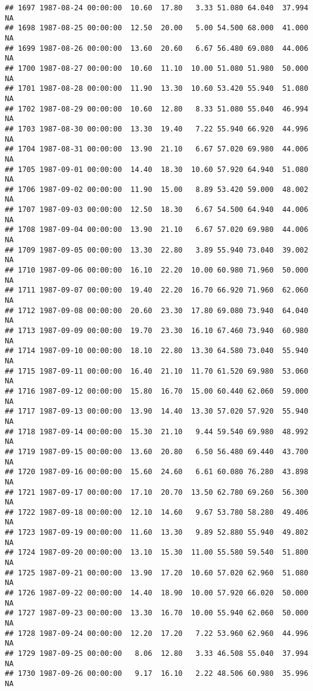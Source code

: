 \documentclass{article}\usepackage{graphicx, color}
\makeatletter
\newenvironment{kframe}{%
 \def\at@end@of@kframe{}%
 \ifinner\ifhmode%
  \def\at@end@of@kframe{\end{minipage}}%
  \begin{minipage}{\columnwidth}%
 \fi\fi%
 \def\FrameCommand##1{\hskip\@totalleftmargin \hskip-\fboxsep
 \colorbox{shadecolor}{##1}\hskip-\fboxsep
     \hskip-\linewidth \hskip-\@totalleftmargin \hskip\columnwidth}%
 \MakeFramed {\advance\hsize-\width
   \@totalleftmargin\z@ \linewidth\hsize
   \@setminipage}}%
 {\par\unskip\endMakeFramed%
 \at@end@of@kframe}
\newenvironment{knitrout}{}{} %
\makeatother
\begin{document}
\begin{knitrout}
\begin{kframe}
\begin{verbatim}
## 1697 1987-08-24 00:00:00  10.60  17.80   3.33 51.080 64.040  37.994     NA
## 1698 1987-08-25 00:00:00  12.50  20.00   5.00 54.500 68.000  41.000     NA
## 1699 1987-08-26 00:00:00  13.60  20.60   6.67 56.480 69.080  44.006     NA
## 1700 1987-08-27 00:00:00  10.60  11.10  10.00 51.080 51.980  50.000     NA
## 1701 1987-08-28 00:00:00  11.90  13.30  10.60 53.420 55.940  51.080     NA
## 1702 1987-08-29 00:00:00  10.60  12.80   8.33 51.080 55.040  46.994     NA
## 1703 1987-08-30 00:00:00  13.30  19.40   7.22 55.940 66.920  44.996     NA
## 1704 1987-08-31 00:00:00  13.90  21.10   6.67 57.020 69.980  44.006     NA
## 1705 1987-09-01 00:00:00  14.40  18.30  10.60 57.920 64.940  51.080     NA
## 1706 1987-09-02 00:00:00  11.90  15.00   8.89 53.420 59.000  48.002     NA
## 1707 1987-09-03 00:00:00  12.50  18.30   6.67 54.500 64.940  44.006     NA
## 1708 1987-09-04 00:00:00  13.90  21.10   6.67 57.020 69.980  44.006     NA
## 1709 1987-09-05 00:00:00  13.30  22.80   3.89 55.940 73.040  39.002     NA
## 1710 1987-09-06 00:00:00  16.10  22.20  10.00 60.980 71.960  50.000     NA
## 1711 1987-09-07 00:00:00  19.40  22.20  16.70 66.920 71.960  62.060     NA
## 1712 1987-09-08 00:00:00  20.60  23.30  17.80 69.080 73.940  64.040     NA
## 1713 1987-09-09 00:00:00  19.70  23.30  16.10 67.460 73.940  60.980     NA
## 1714 1987-09-10 00:00:00  18.10  22.80  13.30 64.580 73.040  55.940     NA
## 1715 1987-09-11 00:00:00  16.40  21.10  11.70 61.520 69.980  53.060     NA
## 1716 1987-09-12 00:00:00  15.80  16.70  15.00 60.440 62.060  59.000     NA
## 1717 1987-09-13 00:00:00  13.90  14.40  13.30 57.020 57.920  55.940     NA
## 1718 1987-09-14 00:00:00  15.30  21.10   9.44 59.540 69.980  48.992     NA
## 1719 1987-09-15 00:00:00  13.60  20.80   6.50 56.480 69.440  43.700     NA
## 1720 1987-09-16 00:00:00  15.60  24.60   6.61 60.080 76.280  43.898     NA
## 1721 1987-09-17 00:00:00  17.10  20.70  13.50 62.780 69.260  56.300     NA
## 1722 1987-09-18 00:00:00  12.10  14.60   9.67 53.780 58.280  49.406     NA
## 1723 1987-09-19 00:00:00  11.60  13.30   9.89 52.880 55.940  49.802     NA
## 1724 1987-09-20 00:00:00  13.10  15.30  11.00 55.580 59.540  51.800     NA
## 1725 1987-09-21 00:00:00  13.90  17.20  10.60 57.020 62.960  51.080     NA
## 1726 1987-09-22 00:00:00  14.40  18.90  10.00 57.920 66.020  50.000     NA
## 1727 1987-09-23 00:00:00  13.30  16.70  10.00 55.940 62.060  50.000     NA
## 1728 1987-09-24 00:00:00  12.20  17.20   7.22 53.960 62.960  44.996     NA
## 1729 1987-09-25 00:00:00   8.06  12.80   3.33 46.508 55.040  37.994     NA
## 1730 1987-09-26 00:00:00   9.17  16.10   2.22 48.506 60.980  35.996     NA

\end{verbatim}
\end{kframe}
\end{knitrout}
\end{document}
